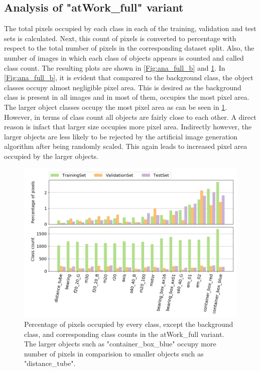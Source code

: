 	\subsection{Analysis of "atWork\_full" variant}
		The total pixels occupied by each class in each of the training, validation and test sets is calculated. Next, this count of pixels is converted to percentage with respect to the total number of pixels in the corresponding dataset split. Also, the number of images in which each class of objects appears is counted and called class count. The resulting plots are shown in \ref{Fig:ana_full_b} and \ref{Fig:ana_full}. In \ref{Fig:ana_full_b}, it is evident that compared to the background class, the object classes occupy almost negligible pixel area. This is desired as the background class is present in all images and in most of them, occupies the most pixel area. The larger object classes occupy the most pixel area as can be seen in \ref{Fig:ana_full}. However, in terms of class count all objects are fairly close to each other. A direct reason is infact that larger size occupies more pixel area. Indirectly however, the larger objects are less likely to be rejected by the artificial image generation algorithm after being randomly scaled. This again leads to increased pixel area occupied by the larger objects.
			
			\begin{figure}
			\centering
				\includegraphics[scale=0.5]{images/full_noB}
				\caption{Percentage of pixels occupied by every class, except the background class, and corresponding class counts in the atWork\_full variant. The larger objects such as "container\_box\_blue" occupy more number of pixels in comparision to smaller objects such as "distance\_tube".}
				\label{Fig:ana_full}
			\end{figure}
		
